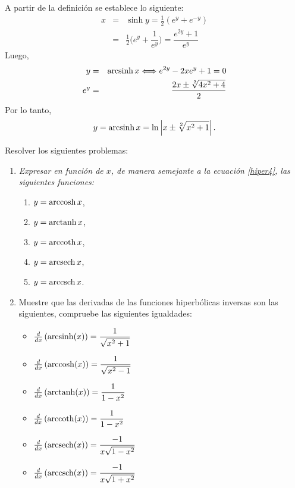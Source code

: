 \begin{tcolorbox}
  A partir de la definición se establece lo siguiente:
  \begin{eqnarray*}
    x &=& \sinh y=\frac{1}{2}(e^{y}+e^{-y}) \\
    &=& \frac{1}{2}\bigg (e^{y}+\dfrac{1}{e^{y}}\bigg ) =  \dfrac{e^{2y}+1}{e^{y}}
  \end{eqnarray*}
  Luego,
  \begin{eqnarray*} y &=& \operatorname{arcsinh} x \Longleftrightarrow e^{2y}-2x e^{y}+1=0 \\ e^{y} &=& \frac{2x\pm\sqrt[2]{4x^{2}+4}}{2}
  \end{eqnarray*}
  Por lo tanto,
  \begin{equation}\label{hiper4}
    y=\operatorname{arcsinh} x= \ln \left| x\pm \sqrt[2]{x^{2}+1}\right|.
  \end{equation}
\end{tcolorbox}

\begin{ejer} Resolver los siguientes problemas:
  \begin{enumerate}
    \item \textit{Expresar en función de $x$, de manera semejante a la ecuación \ref{hiper4},
      las siguientes funciones:}
      \begin{enumerate}
        \item $y=\operatorname{arccosh} x$,
        \item $y=\operatorname{arctanh} x$,
        \item $y=\operatorname{arccoth} x$,
        \item $y=\operatorname{arcsech} x$,
        \item $y=\operatorname{arccsch} x$.
      \end{enumerate}

    \item Muestre que las derivadas de las funciones hiperbólicas inversas son las siguientes, compruebe las siguientes igualdades:
      \begin{itemize}
        \item $\frac{d}{dx}\left(\operatorname{arcsinh} (x)\right) = \dfrac{1}{\sqrt{x^{2}+1}}$
        \item $\frac{d}{dx}\left(\operatorname{arccosh} (x)\right) = \dfrac{1}{\sqrt{x^{2}-1}}$
        \item $\frac{d}{dx}\left(\operatorname{arctanh} (x)\right) = \dfrac{1}{1-x^{2}}$
        \item $\frac{d}{dx}\left(\operatorname{arccoth} (x)\right) = \dfrac{1}{1-x^{2}}$
        \item $\frac{d}{dx}\left(\operatorname{arcsech} (x)\right) = \dfrac{-1}{x\sqrt{1-x^{2}}}$
        \item $\frac{d}{dx}\left(\operatorname{arccsch} (x)\right) = \dfrac{-1}{x\sqrt{1+x^{2}}}$
      \end{itemize}
  \end{enumerate}
\end{ejer}

